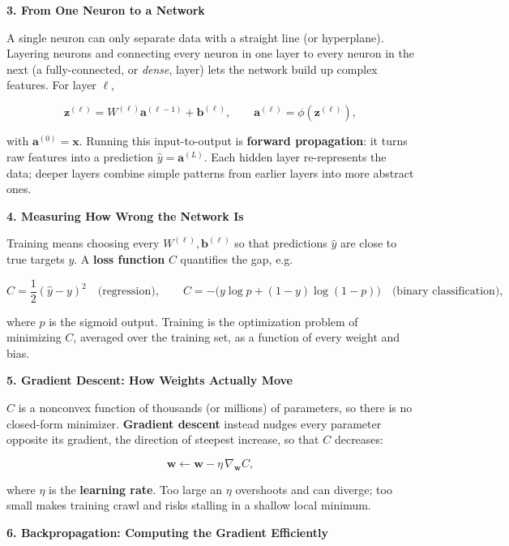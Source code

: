 \documentclass[conference]{IEEEtran}
\begin{document}
\bigskip

\textbf{3. From One Neuron to a Network}

A single neuron can only separate data with a straight line (or
hyperplane). Layering neurons and connecting every neuron in one layer
to every neuron in the next (a fully-connected, or \emph{dense}, layer)
lets the network build up complex features. For layer $\ell$,

\[
  \mathbf{z}^{(\ell)} = W^{(\ell)} \mathbf{a}^{(\ell-1)} + \mathbf{b}^{(\ell)},
  \qquad
  \mathbf{a}^{(\ell)} = \phi\!\left(\mathbf{z}^{(\ell)}\right),
\]

with $\mathbf{a}^{(0)} = \mathbf{x}$. Running this input-to-output is
\textbf{forward propagation}: it turns raw features into a prediction
$\hat{y} = \mathbf{a}^{(L)}$. Each hidden layer re-represents the data;
deeper layers combine simple patterns from earlier layers into more
abstract ones.

\bigskip

\textbf{4. Measuring How Wrong the Network Is}

Training means choosing every $W^{(\ell)}, \mathbf{b}^{(\ell)}$ so that
predictions $\hat{y}$ are close to true targets $y$. A \textbf{loss
function} $C$ quantifies the gap, e.g.

\[
  C = \frac{1}{2}(\hat{y}-y)^2 \quad \text{(regression)}, \qquad
  C = -\big(y\log p + (1-y)\log(1-p)\big) \quad \text{(binary classification)},
\]

where $p$ is the sigmoid output. Training is the optimization problem of
minimizing $C$, averaged over the training set, as a function of every
weight and bias.

\bigskip

\textbf{5. Gradient Descent: How Weights Actually Move}

$C$ is a nonconvex function of thousands (or millions) of parameters, so
there is no closed-form minimizer. \textbf{Gradient descent} instead
nudges every parameter opposite its gradient, the direction of steepest
increase, so that $C$ decreases:

\[
  \mathbf{w} \gets \mathbf{w} - \eta \, \nabla_{\mathbf{w}} C,
\]

where $\eta$ is the \textbf{learning rate}. Too large an $\eta$ overshoots
and can diverge; too small makes training crawl and risks stalling in a
shallow local minimum.

\bigskip

\textbf{6. Backpropagation: Computing the Gradient Efficiently}
\end{document}
